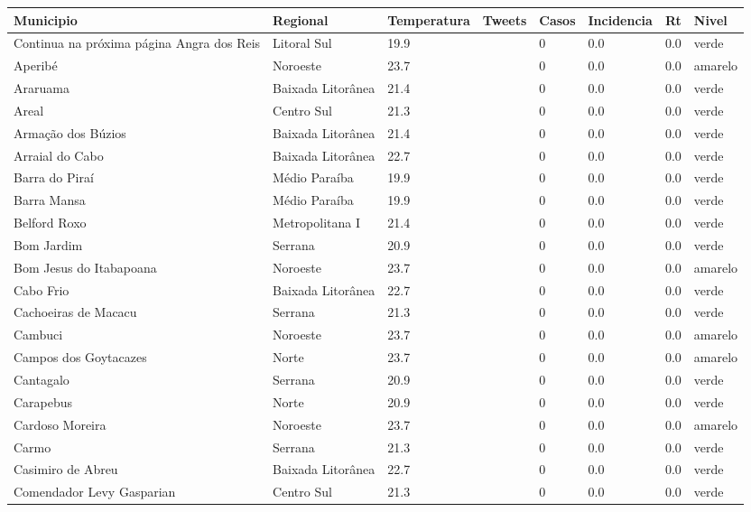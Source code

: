 \begin{longtable}{l|lllllll}
  \hline
Municipio & Regional & Temperatura & Tweets & Casos & Incidencia & Rt & Nivel \\ 
  \hline
\endhead
\hline
{\footnotesize Continua na próxima página}
\endfoot
\endlastfoot
Angra dos Reis & Litoral Sul & 19.9 &  & 0 & 0.0 & 0.0 & verde \\ 
  Aperibé & Noroeste & 23.7 &  & 0 & 0.0 & 0.0 & amarelo \\ 
  Araruama & Baixada Litorânea & 21.4 &  & 0 & 0.0 & 0.0 & verde \\ 
  Areal & Centro Sul & 21.3 &  & 0 & 0.0 & 0.0 & verde \\ 
  Armação dos Búzios & Baixada Litorânea & 21.4 &  & 0 & 0.0 & 0.0 & verde \\ 
  Arraial do Cabo & Baixada Litorânea & 22.7 &  & 0 & 0.0 & 0.0 & verde \\ 
  Barra do Piraí & Médio Paraíba & 19.9 &  & 0 & 0.0 & 0.0 & verde \\ 
  Barra Mansa & Médio Paraíba & 19.9 &  & 0 & 0.0 & 0.0 & verde \\ 
  Belford Roxo & Metropolitana I & 21.4 &  & 0 & 0.0 & 0.0 & verde \\ 
  Bom Jardim & Serrana & 20.9 &  & 0 & 0.0 & 0.0 & verde \\ 
  Bom Jesus do Itabapoana & Noroeste & 23.7 &  & 0 & 0.0 & 0.0 & amarelo \\ 
  Cabo Frio & Baixada Litorânea & 22.7 &  & 0 & 0.0 & 0.0 & verde \\ 
  Cachoeiras de Macacu & Serrana & 21.3 &  & 0 & 0.0 & 0.0 & verde \\ 
  Cambuci & Noroeste & 23.7 &  & 0 & 0.0 & 0.0 & amarelo \\ 
  Campos dos Goytacazes & Norte & 23.7 &  & 0 & 0.0 & 0.0 & amarelo \\ 
  Cantagalo & Serrana & 20.9 &  & 0 & 0.0 & 0.0 & verde \\ 
  Carapebus & Norte & 20.9 &  & 0 & 0.0 & 0.0 & verde \\ 
  Cardoso Moreira & Noroeste & 23.7 &  & 0 & 0.0 & 0.0 & amarelo \\ 
  Carmo & Serrana & 21.3 &  & 0 & 0.0 & 0.0 & verde \\ 
  Casimiro de Abreu & Baixada Litorânea & 22.7 &  & 0 & 0.0 & 0.0 & verde \\ 
  Comendador Levy Gasparian & Centro Sul & 21.3 &  & 0 & 0.0 & 0.0 & verde \\ 

\end{longtable}
